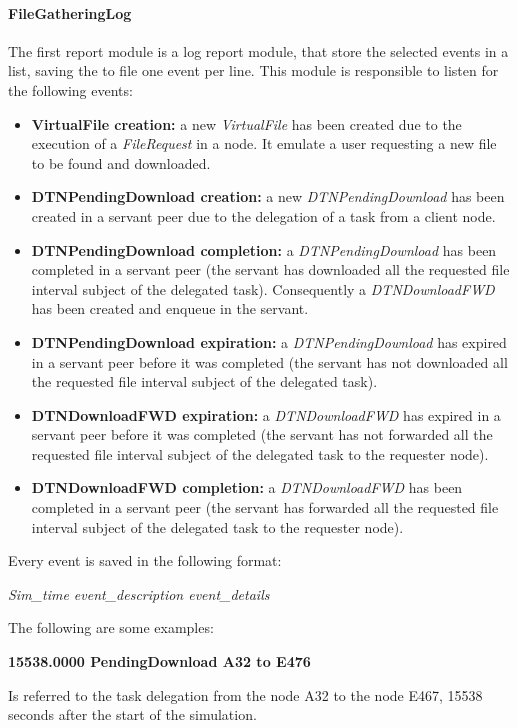 \paragraph{FileGatheringLog}
The first report module is a log report module, that store the selected events in a list, saving the to file one event per line. This module is responsible to listen for the following events:
\begin{itemize}
\item \textbf{VirtualFile creation:} a new \textit{VirtualFile} has been created due to the execution of a \textit{FileRequest} in a node. It emulate a user requesting a new file to be found and downloaded.
\item \textbf{DTNPendingDownload creation:} a new \textit{DTNPendingDownload} has been created in a servant peer due to the delegation of a task from a client node.
\item \textbf{DTNPendingDownload completion:} a \textit{DTNPendingDownload} has been completed in a servant peer (the servant has downloaded all the requested file interval subject of the delegated task). Consequently a \textit{DTNDownloadFWD} has been created and enqueue in the servant.
\item \textbf{DTNPendingDownload expiration:} a \textit{DTNPendingDownload} has expired in a servant peer before it was completed (the servant has not downloaded all the requested file interval subject of the delegated task).
\item \textbf{DTNDownloadFWD expiration:} a \textit{DTNDownloadFWD} has expired in a servant peer before it was completed (the servant has not forwarded all the requested file interval subject of the delegated task to the requester node).
\item \textbf{DTNDownloadFWD completion:} a \textit{DTNDownloadFWD} has been completed in a servant peer (the servant has forwarded all the requested file interval subject of the delegated task to the requester node).
\end{itemize}

Every event is saved in the following format:
\begin{center}
\textit{Sim\_time	event\_description	event\_details}
\end{center}
The following are some examples:

\begin{center}
\textbf{15538.0000	PendingDownload	A32 to E476}
\end{center}
Is referred to the task delegation from the node A32 to the node E467, 15538 seconds after the start of the simulation.
\\

